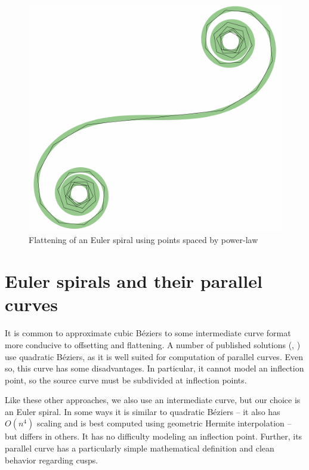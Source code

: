 \documentclass[sigconf, authordraft]{acmart}
\begin{document}
\begin{figure}
    \includegraphics[scale=0.3]{es_flatten}
    \caption{Flattening of an Euler spiral using points spaced by power-law}
    \label{fig:es_flatten}
\end{figure}


\section{Euler spirals and their parallel curves}

It is common to approximate cubic Béziers to some intermediate curve format more conducive to offsetting and flattening. A number of published solutions (\citet{Yzerman2020}, \citet{Nehab2020}) use quadratic Béziers, as it is well suited for computation of parallel curves. Even so, this curve has some disadvantages. In particular, it cannot model an inflection point, so the source curve must be subdivided at inflection points.

Like these other approaches, we also use an intermediate curve, but our choice is an Euler spiral. In some ways it is similar to quadratic Béziers -- it also has $O(n^4)$ scaling and is best computed using geometric Hermite interpolation -- but differs in others. It has no difficulty modeling an inflection point. Further, its parallel curve has a particularly simple mathematical definition and clean behavior regarding cusps.
\end{document}
